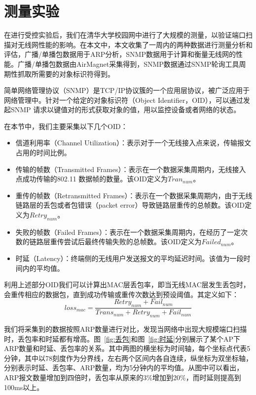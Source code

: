 \section{测量实验}
在进行受控实验后，我们在清华大学校园网中进行了大规模的测量，以验证端口扫描对无线网性能的影响。在本文中，本文收集了一周内的两种数据进行测量分析和评估，广播/单播包数据用于ARP分析，SNMP数据用于计算和衡量无线网的性能。广播/单播包数据由AirMagnet采集得到，SNMP数据通过SNMP轮询工具周期性抓取所需要的对象标识符得到。



简单网络管理协议（SNMP）是TCP/IP协议簇的一个应用层协议，被广泛应用于网络管理中\cite{perkins1997understanding}。针对一个给定的对象标识符（Object Identifier，OID），可以通过发起SNMP 请求以键值对的形式获取对象的值，用以监控设备或者网络的状态。

在本节中，我们主要采集以下几个OID：

\begin{itemize}
  \item 信道利用率（Channel Utilization）：表示对于一个无线接入点来说，传输报文占用的时间比例。
  \item 传输的帧数（Transmitted Frames）：表示在一个数据采集周期内，无线接入点成功传输的802.11 数据帧的数量。该OID定义为$Tran_{num}$。
  \item 重传的帧数（Retransmitted Frames）：表示在一个数据采集周期内，由于无线链路层的丢包或者包错误（packet error）导致链路层重传的总帧数。该OID定义为$Retry_{num}$。
  \item 失败的帧数（Failed Frames）：表示在一个数据采集周期内，在经历了一定次数的链路层重传尝试后最终传输失败的总帧数。该OID定义为$Failed_{num}$。
  \item 时延（Latency）：终端侧的无线用户发送报文的平均延迟时间。该值为一段时间内的平均值。
\end{itemize}
利用上述部分OID我们可以计算出MAC层丢包率，即当无线MAC层发生丢包时，会重传相应的数据包，直到成功传输或重传次数达到预设阈值。其定义如下：
\begin{equation}
  {loss}_{mac} = \frac{{Retry}_{num} + {Fail}_{num}}{{Trans}_{num} + {Retry}_{num} + {Fail}_{num}}
\end{equation}

我们将采集到的数据按照ARP数量进行对比，发现当网络中出现大规模端口扫描时，丢包率和时延都有增高。图~\ref{fig:丢包}和图~\ref{fig:时延}分别展示了某个AP下ARP数量和时延、丢包率的关系。其中两图的横坐标为时间轴，每个坐标点代表5分钟，其中以78刻度作为分界线，左右两个区间内各自连续，纵坐标为双坐标轴，分别表示时延、丢包率、ARP数量，均为5分钟内的平均值。从图中可以看出，ARP报文数量增加到四倍时，丢包率从原来的3\%增加到20\%，而时延则提高到100ms以上。

